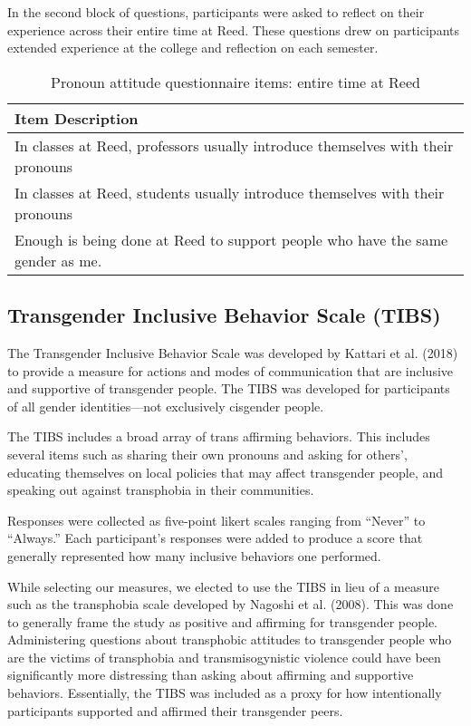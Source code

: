 \documentclass[12pt,twoside]{reedthesis}
\begin{document}
In the second block of questions, participants were asked to reflect on their experience across their entire time at Reed. These questions drew on participants extended experience at the college and reflection on each semester.
\begin{table}

\caption{\label{tab:unnamed-chunk-2}Pronoun attitude questionnaire items: entire time at Reed}
\centering
\begin{tabular}[t]{l}
\hline
Item Description\\
\hline
In classes at Reed, professors usually introduce themselves with their pronouns\\
\hline
In classes at Reed, students usually introduce themselves with their pronouns\\
\hline
Enough is being done at Reed to support people who have the same gender as me.\\
\hline
\end{tabular}
\end{table}
\hypertarget{transgender-inclusive-behavior-scale-tibs}{%
\subsection{Transgender Inclusive Behavior Scale (TIBS)}\label{transgender-inclusive-behavior-scale-tibs}}

The Transgender Inclusive Behavior Scale was developed by Kattari et al. (2018) to provide a measure for actions and modes of communication that are inclusive and supportive of transgender people. The TIBS was developed for participants of all gender identities---not exclusively cisgender people.

The TIBS includes a broad array of trans affirming behaviors. This includes several items such as sharing their own pronouns and asking for others', educating themselves on local policies that may affect transgender people, and speaking out against transphobia in their communities.

Responses were collected as five-point likert scales ranging from ``Never'' to ``Always.'' Each participant's responses were added to produce a score that generally represented how many inclusive behaviors one performed.

While selecting our measures, we elected to use the TIBS in lieu of a measure such as the transphobia scale developed by Nagoshi et al. (2008). This was done to generally frame the study as positive and affirming for transgender people. Administering questions about transphobic attitudes to transgender people who are the victims of transphobia and transmisogynistic violence could have been significantly more distressing than asking about affirming and supportive behaviors. Essentially, the TIBS was included as a proxy for how intentionally participants supported and affirmed their transgender peers.
\end{document}
